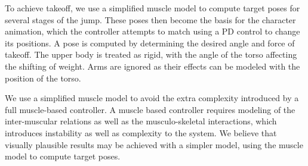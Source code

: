 To achieve takeoff, we use a simplified muscle model to compute target poses for several stages of the jump.  These poses then become the basis for the character animation, which the controller attempts to match using a PD control to change its positions.  A pose is computed by determining the desired angle and force of takeoff.  The upper body is treated as rigid, with the angle of the torso affecting the shifting of weight.  Arms are ignored as their effects can be modeled with the position of the torso.

We use a simplified muscle model to avoid the extra complexity introduced by a full muscle-based controller.  A muscle based controller requires modeling of the inter-muscular relations as well as the musculo-skeletal interactions, which introduces instability as well as complexity to the system.  We believe that visually plausible results may be achieved with a simpler model, using the muscle model to compute target poses.